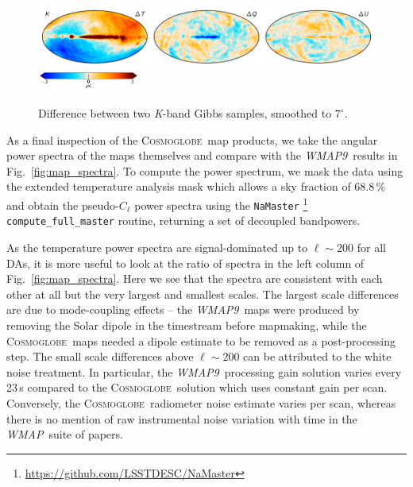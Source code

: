 \documentclass[twocolumn]{../../common/aa}
\def\WMAP{\emph{WMAP}}
\def\WMAPnine{\emph{WMAP9}}
\newcommand{\cosmoglobe}{\textsc{Cosmoglobe}}
\newcommand{\K}[0]{\textit K}
\begin{document}
\begin{figure}[t]
	\centering
	\includegraphics[width=\textwidth]{figures/023-WMAP_K_sampdiff.pdf}\\
	\includegraphics[width=0.30\textwidth]{figures/cbar_3uK.pdf}        
	\caption{Difference between two \K-band Gibbs samples, smoothed to $7^\circ$.}
        \label{fig:Ksampdiff}
\end{figure}









As a final inspection of the \cosmoglobe\ map products, we take the angular power spectra of the maps themselves and compare with the \WMAPnine\ results in Fig.~\ref{fig:map_spectra}. To compute the power spectrum, we mask the data using the extended temperature analysis mask which allows a sky fraction of 68.8\,\% and obtain the pseudo-$C_\ell$ power spectra using the \texttt{NaMaster} \citep{namaster}\footnote{\url{https://github.com/LSSTDESC/NaMaster}} \texttt{compute\_full\_master} routine, returning a set of decoupled bandpowers.

As the temperature power spectra are signal-dominated up to $\ell\sim200$ for all DAs, it is more useful to look at the ratio of spectra in the left column of Fig.~\ref{fig:map_spectra}. Here we see that the spectra are consistent with each other at all but the very largest and smallest scales. The largest scale differences are due to mode-coupling effects -- the \WMAPnine\ maps were produced by removing the Solar dipole in the timestream before mapmaking, while the \cosmoglobe\ maps needed a dipole estimate to be removed as a post-processing step. The small scale differences above $\ell\sim200$ can be attributed to the white noise treatment. In particular, the \WMAPnine\ processing gain solution varies every 23\,s compared to the \cosmoglobe\ solution which uses constant gain per scan. Conversely, the \cosmoglobe\ radiometer noise estimate varies per scan, whereas there is no mention of raw instrumental noise variation with time in the \WMAP\ suite of papers.
\end{document}
